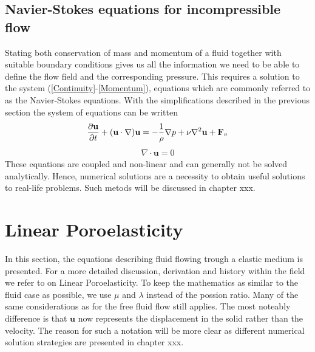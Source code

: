 \subsection{Navier-Stokes equations for incompressible flow}
Stating both conservation of mass and momentum of a fluid together with suitable boundary conditions gives us all the information we need to be able to define the flow field and the corresponding pressure. This requires a solution to the system (\ref{Continuity}-\ref{Momentum}), equations which are commonly referred to as the Navier-Stokes equations. With the simplifications described in the previous section the system of equations can be written
\begin{align}
\frac{\partial \mathbf{u}}{\partial t} + (\mathbf{u} \cdot \nabla) \mathbf{u} = -\frac{1}{\rho}\nabla p + \nu\nabla^2 \mathbf{u} + \mathbf{F}_v \label{Navier}
\end{align}
\begin{align}
\nabla \cdot \mathbf{u} = 0 \label{Stokes}
\end{align}
These equations are coupled and non-linear and can generally not be solved analytically. Hence, numerical solutions are a necessity to obtain useful solutions to real-life problems. Such metods will be discussed in chapter xxx. 


\section{Linear Poroelasticity}
In this section, the equations describing fluid flowing trough a elastic medium is presented. For a more detailed discussion, derivation and history within the field we refer to \cite{Wang} on Linear Poroelasticity. To keep the mathematics as similar to the fluid case as possible, we use $\mu$ and $\lambda$ instead of the possion ratio. Many of the same considerations as for the free fluid flow still applies. The most noteably difference is that $\mathbf{u}$ now represents the displacement in the solid rather than the velocity. The reason for such a notation will be more clear as different numerical solution strategies are presented in chapter xxx. \\
